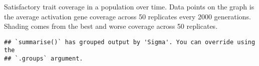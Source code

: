 \documentclass[]{book}
\newenvironment{Shaded}{\begin{snugshade}}{\end{snugshade}}
\newcommand{\DataTypeTok}[1]{\textcolor[rgb]{0.13,0.29,0.53}{#1}}
\newcommand{\KeywordTok}[1]{\textcolor[rgb]{0.13,0.29,0.53}{\textbf{#1}}}
\newcommand{\NormalTok}[1]{#1}
\newcommand{\OperatorTok}[1]{\textcolor[rgb]{0.81,0.36,0.00}{\textbf{#1}}}
\newcommand{\StringTok}[1]{\textcolor[rgb]{0.31,0.60,0.02}{#1}}
\begin{document}
Satisfactory trait coverage in a population over time.
Data points on the graph is the average activation gene coverage across 50 replicates every 2000 generations.
Shading comes from the best and worse coverage across 50 replicates.

\begin{Shaded}
\end{Shaded}

\begin{verbatim}
## `summarise()` has grouped output by 'Sigma'. You can override using the
## `.groups` argument.
\end{verbatim}
\end{document}
